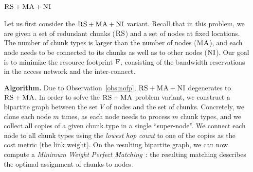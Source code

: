 \documentclass[preprint,12pt]{elsarticle}
\newcommand{\MaFactor}{m}
\newcommand{\ChunkType}{\tau}
\newcommand{\VirtualNodes}{\ensuremath{V}}
\newcommand{\CC}{\textsc{NI}}
\newcommand{\RS}{\textsc{RS}}
\newcommand{\MA}{\textsc{MA}}
\newcommand{\Cost}{\textsc{F}}
\begin{document}
\subsubsection{$\RS+\MA+\CC$}

Let us first consider the $\RS+\MA+\CC$ variant.
Recall that in this problem,
we are given a set of redundant chunks ($\RS$) and a set of nodes
at fixed locations. The number of chunk types is larger than the number
of nodes ($\MA$), and each node needs to be connected
to its chunks as well as to other nodes ($\CC$).
Our goal is to minimize the resource footprint $\Cost$, consisting
of the bandwidth reservations in the access network and the inter-connect.

\textbf{Algorithm.} Due to Observation~\ref{obs:nofp}, $\RS+\MA+\CC$ degenerates to $\RS+\MA$.
In order to solve the $\RS+\MA$ problem variant,
we construct a bipartite
graph between the set
$\VirtualNodes$ of nodes and
the set of chunks.
Concretely, we clone each node $\MaFactor$ times,
as each node needs to process
$\MaFactor$ chunk types, and we collect all copies of a given chunk type in a
single %
``super-node''. We connect each node to all chunk types using the
\emph{lowest hop count} to one of the copies as the cost metric (the link weight).
On the resulting bipartite graph, we can now compute a \emph{Minimum Weight
Perfect
Matching}~\cite{gabow_scaling_algorithm}:
the resulting matching describes the optimal assignment of chunks to nodes.

\end{document}
